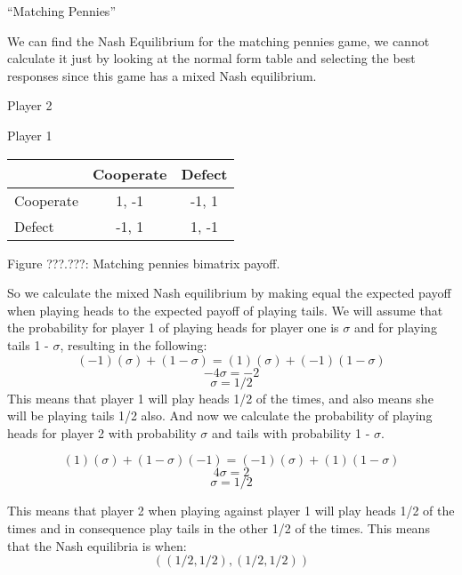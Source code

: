 \documentclass{article}
\begin{document}
``Matching Pennies''

We can find the Nash Equilibrium for the matching pennies game, we cannot calculate it just by looking at the normal form table and selecting the best responses since this game has a mixed Nash equilibrium.
\begin{center}
Player 2

Player 1
\begin{tabular}{|l|c|c|}
\hline
 & Cooperate & Defect\\ 
\hline
Cooperate & 1, -1 & -1, 1\\
\hline
Defect & -1, 1 & 1, -1\\
\hline
\end{tabular}

Figure ???.???: Matching pennies bimatrix payoff.
\end{center}

So we calculate the mixed Nash equilibrium by making equal the expected payoff  when playing heads to the expected payoff of playing tails. We will assume that the probability for player 1 of playing heads for player one is $\sigma$ and for playing tails 1 - $\sigma$, resulting in the following:
\begin{equation}
(-1)(\sigma) + (1 - \sigma) = (1)(\sigma) + (-1)(1 - \sigma)
\end{equation}
\begin{equation}
-4 \sigma = -2
\end{equation}
\begin{equation}
\sigma = 1/2
\end{equation}
This means that player 1 will play heads 1/2 of the times, and also means she will be playing tails 1/2 also. And now we calculate the probability of playing heads for player 2 with probability $\sigma$ and tails with probability 1 - $\sigma$.

\begin{equation}
(1)(\sigma) + (1 - \sigma)(-1) = (-1)(\sigma) + (1)(1 - \sigma)
\end{equation}
\begin{equation}
4 \sigma = 2
\end{equation}
\begin{equation}
\sigma = 1/2
\end{equation}

This means that player 2 when playing against player 1 will play heads  1/2  of the times and in consequence play tails in the other 1/2 of the times. 
This means that the Nash equilibria is when:
\begin{equation}
((1/2, 1/2), (1/2, 1/2))
\end{equation}
\end{document}
